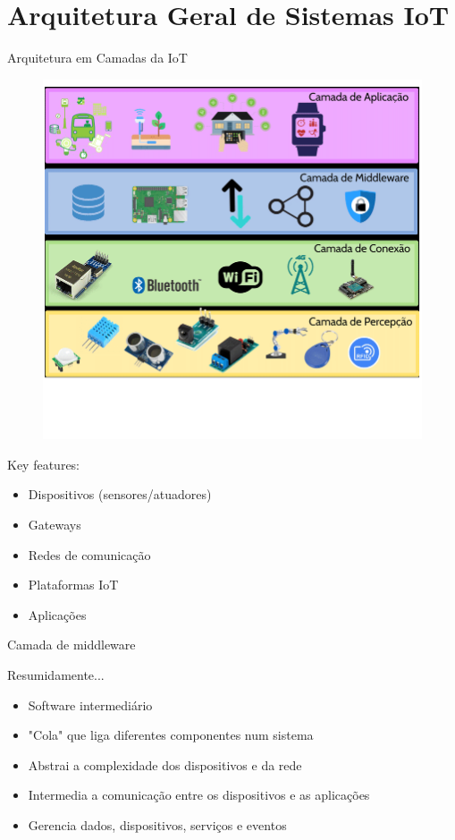 \documentclass[aspectratio=169,xcolor=dvipsnames]{beamer}
\begin{document}
\section{Arquitetura Geral de Sistemas IoT}
\begin{frame}{Arquitetura em Camadas da IoT}
\begin{figure}
    \centering
 \includegraphics[scale=.32]{Representacao-de-camadas-da-arquitetura-IoT-Adaptado-de-Andrade-et-al-2018}
\end{figure}

  Key features:
  \begin{itemize}
    \item Dispositivos (sensores/atuadores)
    \item Gateways
    \item Redes de comunicação
    \item Plataformas IoT
    \item Aplicações
  \end{itemize}
\end{frame}

\begin{frame}{Camada de middleware}
\begin{exampleblock}{Resumidamente...}
    \begin{itemize}
        \item Software intermediário
        \item "Cola" que liga diferentes componentes num sistema  
        \item Abstrai a complexidade dos dispositivos e da rede
        \item Intermedia a comunicação entre os dispositivos e as aplicações
        \item Gerencia dados, dispositivos, serviços e eventos
    \end{itemize}
    \end{exampleblock} 
    \end{frame}
\end{document}
